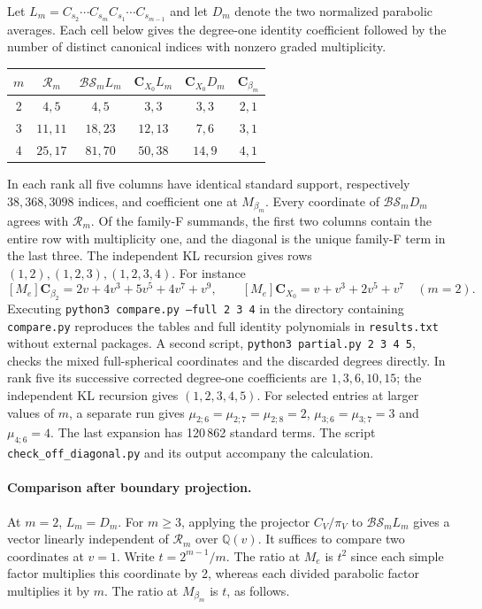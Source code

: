 Let $L_m=C_{s_2}\cdots C_{s_m}C_{s_1}\cdots C_{s_{m-1}}$ and let
$D_m$ denote the two normalized parabolic averages. Each cell below
gives the degree-one identity coefficient followed by the number of
distinct canonical indices with nonzero graded multiplicity.
\begin{center}
\begin{tabular}{c|ccccc}
$m$ & $\mathcal R_m$ & $\mathcal{BS}_m L_m$ &
$\mathbf C_{X_0}L_m$ & $\mathbf C_{X_0}D_m$ & $\mathbf C_{\beta_m}$\\ \hline
2 & $4,5$ & $4,5$ & $3,3$ & $3,3$ & $2,1$\\
3 & $11,11$ & $18,23$ & $12,13$ & $7,6$ & $3,1$\\
4 & $25,17$ & $81,70$ & $50,38$ & $14,9$ & $4,1$
\end{tabular}
\end{center}
In each rank all five columns have identical standard support,
respectively $38,368,3098$ indices, and coefficient one at $M_{\beta_m}$.
Every coordinate of $\mathcal{BS}_mD_m$ agrees with $\mathcal R_m$.
Of the family-F summands, the first two columns contain the entire row
with multiplicity one, and the diagonal is the unique family-F term in the last three.
The independent KL recursion gives rows $(1,2),(1,2,3),(1,2,3,4)$.
For instance
\[
 [M_e]\mathbf C_{\beta_2}=2v+4v^3+5v^5+4v^7+v^9,\qquad
 [M_e]\mathbf C_{X_0}=v+v^3+2v^5+v^7\quad(m=2).
\]
Executing \texttt{python3 compare.py --full 2 3 4} in the directory
containing \texttt{compare.py} reproduces the tables and full identity
polynomials in \texttt{results.txt} without external packages. A second
script, \texttt{python3 partial.py 2 3 4 5}, checks the mixed
full-spherical coordinates and the discarded degrees directly. In rank
five its successive corrected degree-one coefficients are $1,3,6,10,15$;
the independent KL recursion gives $(1,2,3,4,5)$. For selected entries at larger values of $m$, a separate run gives $\mu_{2;6}=\mu_{2;7}=\mu_{2;8}=2$, $\mu_{3;6}=\mu_{3;7}=3$ and $\mu_{4;6}=4$. The last expansion has 120\,862 standard terms. The script \texttt{check\_off\_diagonal.py} and its output accompany the calculation.

\paragraph{Comparison after boundary projection.}
At $m=2$, $L_m=D_m$. For $m\ge3$, applying the projector $C_V/\pi_V$ to
$\mathcal{BS}_mL_m$ gives a vector linearly independent of
$\mathcal R_m$ over $\mathbb Q(v)$. It suffices to compare two
coordinates at $v=1$. Write $t=2^{m-1}/m$. The ratio at $M_e$ is
$t^2$ since each simple factor multiplies this coordinate by 2,
whereas each divided parabolic factor multiplies it by $m$.
The ratio at $M_{\beta_m}$ is $t$, as follows.

